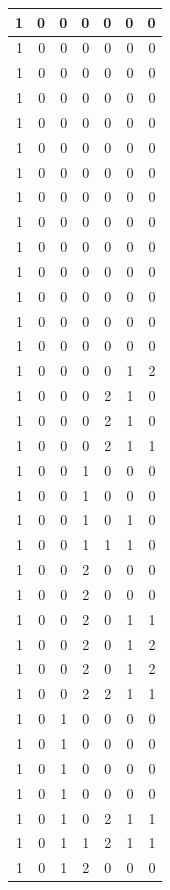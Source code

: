 \documentclass[
  12pt,
]{krantz}
\begin{document}
\begin{tabular}{r|r|r|r|r|r|r}
\hline
1 & 0 & 0 & 0 & 0 & 0 & 0\\
\hline
1 & 0 & 0 & 0 & 0 & 0 & 0\\
\hline
1 & 0 & 0 & 0 & 0 & 0 & 0\\
\hline
1 & 0 & 0 & 0 & 0 & 0 & 0\\
\hline
1 & 0 & 0 & 0 & 0 & 0 & 0\\
\hline
1 & 0 & 0 & 0 & 0 & 0 & 0\\
\hline
1 & 0 & 0 & 0 & 0 & 0 & 0\\
\hline
1 & 0 & 0 & 0 & 0 & 0 & 0\\
\hline
1 & 0 & 0 & 0 & 0 & 0 & 0\\
\hline
1 & 0 & 0 & 0 & 0 & 0 & 0\\
\hline
1 & 0 & 0 & 0 & 0 & 0 & 0\\
\hline
1 & 0 & 0 & 0 & 0 & 0 & 0\\
\hline
1 & 0 & 0 & 0 & 0 & 0 & 0\\
\hline
1 & 0 & 0 & 0 & 0 & 0 & 0\\
\hline
1 & 0 & 0 & 0 & 0 & 1 & 2\\
\hline
1 & 0 & 0 & 0 & 2 & 1 & 0\\
\hline
1 & 0 & 0 & 0 & 2 & 1 & 0\\
\hline
1 & 0 & 0 & 0 & 2 & 1 & 1\\
\hline
1 & 0 & 0 & 1 & 0 & 0 & 0\\
\hline
1 & 0 & 0 & 1 & 0 & 0 & 0\\
\hline
1 & 0 & 0 & 1 & 0 & 1 & 0\\
\hline
1 & 0 & 0 & 1 & 1 & 1 & 0\\
\hline
1 & 0 & 0 & 2 & 0 & 0 & 0\\
\hline
1 & 0 & 0 & 2 & 0 & 0 & 0\\
\hline
1 & 0 & 0 & 2 & 0 & 1 & 1\\
\hline
1 & 0 & 0 & 2 & 0 & 1 & 2\\
\hline
1 & 0 & 0 & 2 & 0 & 1 & 2\\
\hline
1 & 0 & 0 & 2 & 2 & 1 & 1\\
\hline
1 & 0 & 1 & 0 & 0 & 0 & 0\\
\hline
1 & 0 & 1 & 0 & 0 & 0 & 0\\
\hline
1 & 0 & 1 & 0 & 0 & 0 & 0\\
\hline
1 & 0 & 1 & 0 & 0 & 0 & 0\\
\hline
1 & 0 & 1 & 0 & 2 & 1 & 1\\
\hline
1 & 0 & 1 & 1 & 2 & 1 & 1\\
\hline
1 & 0 & 1 & 2 & 0 & 0 & 0\\

\end{tabular}
\end{document}
